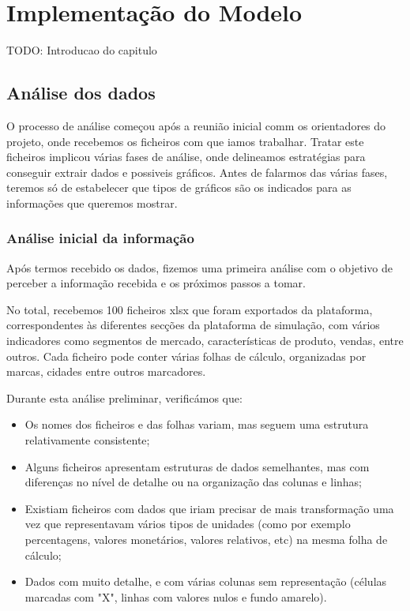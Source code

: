 

\chapter{Implementação do Modelo}
\label{ch:implementacaoDoModelo}

TODO: Introducao do capitulo

\section{Análise dos dados}
O processo de análise começou após a reunião inicial comm os orientadores do projeto, onde recebemos os ficheiros com que iamos trabalhar. Tratar este ficheiros implicou várias fases de análise, onde delineamos estratégias para conseguir extrair dados e possiveis gráficos. Antes de falarmos das várias fases, teremos só de estabelecer que tipos de gráficos são os indicados para as informações que queremos mostrar.

\subsection{Análise inicial da informação}
Após termos recebido os dados, fizemos uma primeira análise com o objetivo de perceber a informação recebida e os próximos passos a tomar.

No total, recebemos 100 ficheiros \gls{xlsx} que foram exportados da plataforma, correspondentes às diferentes secções da plataforma de simulação, com vários indicadores como segmentos de mercado, características de produto, vendas, entre outros. Cada ficheiro pode conter várias folhas de cálculo, organizadas por marcas, cidades entre outros marcadores.

Durante esta análise preliminar, verificámos que:
\begin{itemize}
    \item Os nomes dos ficheiros e das folhas variam, mas seguem uma estrutura relativamente consistente;
    \item Alguns ficheiros apresentam estruturas de dados semelhantes, mas com diferenças no nível de detalhe ou na organização das colunas e linhas;
    \item Existiam ficheiros com dados que iriam precisar de mais transformação uma vez que representavam vários tipos de unidades (como por exemplo percentagens, valores monetários, valores relativos, etc) na mesma folha de cálculo;
    \item Dados com muito detalhe, e com várias colunas sem representação (células marcadas com "X", linhas com valores nulos e fundo amarelo).
\end{itemize}

